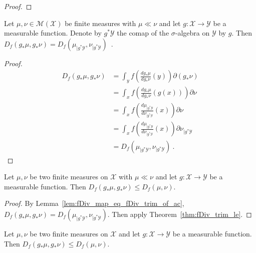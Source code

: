 \begin{proof}%
{}

\end{proof}


\begin{lemma}
  \label{lem:fDiv_map_eq_fDiv_trim_of_ac}
  Let $\mu, \nu \in \mathcal M(\mathcal X)$ be finite measures with $\mu \ll \nu$ and let $g : \mathcal X \to \mathcal Y$ be a measurable function. Denote by $g^* \mathcal Y$ the comap of the $\sigma$-algebra on $\mathcal Y$ by $g$. Then
  $D_f(g_* \mu, g_* \nu) = D_f(\mu_{| g^* \mathcal Y}, \nu_{| g^* \mathcal Y})$~.
\end{lemma}

\begin{proof}%
{}
\begin{align*}
D_f(g_* \mu, g_* \nu)
&= \int_y f \left( \frac{d g_*\mu}{d g_*\nu}(y)\right) \partial(g_*\nu)
\\
&= \int_x f \left( \frac{d g_*\mu}{d g_*\nu}(g(x))\right) \partial\nu
\\
&= \int_x f \left(\frac{d \mu_{| g^* \mathcal Y}}{d \nu_{| g^* \mathcal Y}}(x) \right) \partial\nu
\\
&= \int_x f \left(\frac{d \mu_{| g^* \mathcal Y}}{d \nu_{| g^* \mathcal Y}}(x) \right) \partial\nu_{| g^* \mathcal Y}
\\
&= D_f(\mu_{| g^* \mathcal Y}, \nu_{| g^* \mathcal Y})
\: .
\end{align*}
\end{proof}


\begin{lemma}
  \label{lem:fDiv_map_le_of_ac}
  Let $\mu, \nu$ be two finite measures on $\mathcal X$ with $\mu \ll \nu$ and let $g : \mathcal X \to \mathcal Y$ be a measurable function. Then
  $D_f(g_* \mu, g_* \nu) \le D_f(\mu, \nu)$.
\end{lemma}

\begin{proof}%
{}
By Lemma~\ref{lem:fDiv_map_eq_fDiv_trim_of_ac},  $D_f(g_* \mu, g_* \nu) = D_f(\mu_{| g^* \mathcal Y}, \nu_{| g^* \mathcal Y})$. Then apply Theorem~\ref{thm:fDiv_trim_le}.
\end{proof}


\begin{theorem}
  \label{thm:fDiv_map_le}
  Let $\mu, \nu$ be two finite measures on $\mathcal X$ and let $g : \mathcal X \to \mathcal Y$ be a measurable function. Then
  $D_f(g_* \mu, g_* \nu) \le D_f(\mu, \nu)$.
\end{theorem}

